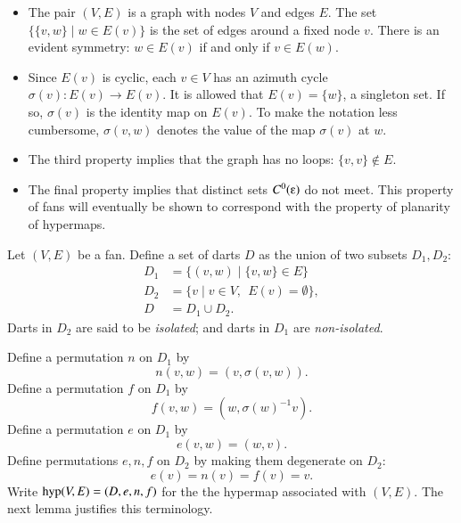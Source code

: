 \begin{remark}
\begin{itemize}
\item The pair $(V,E)$ is a graph with nodes $V$ and edges $E$.  The set
$\{\{v,w\}\mid w\in E(v)\}$ is the set of edges around a fixed node $v$.
There is an evident symmetry:  $w\in E(v)$ if and only if $v\in E(w)$.   
%
\item
Since $E(v)$ is cyclic,
each $v\in V$ has an azimuth cycle $\sigma(v):E(v)\to E(v)$.
It is allowed that $E(v) = \{w\}$,  a
singleton set. If so,
$\sigma(v)$ is the identity map on $E(v)$.
%
To make the notation less cumbersome, $\sigma(v,w)$ denotes the value of the map $\sigma(v)$ at $w$.
%
\item 
The third property implies that the graph has no loops: $\{v,v\}\not\in E$.
%
\item The final property implies that distinct sets $C^0(\e)$
do not meet.   This property of fans will eventually be shown to correspond with the property of planarity of hypermaps.
%
\end{itemize}
\end{remark}


Let $(V,E)$ be a fan.  Define a set of darts $D$ as the union of
two subsets $D_1,D_2$:
    $$
    \begin{array}{lll}
    D_1 &= \{(v,w)\mid \{v,w\}\in E\}\\
    D_2 &= \{v \mid v\in V,\ \ E(v) = \emptyset\},\\
    D   &= D_1\cup D_2.
    \end{array}
    $$
Darts in $D_2$ are said to be {\it isolated}; and darts in $D_1$ are {\it non-isolated}.
%

Define a permutation $n$ on $D_1$ by
    $$n(v,w) = (v,\sigma(v,w)).$$
Define a permutation $f$ on $D_1$ by
    $$
    f (v,w) = (w,\sigma(w)^{-1} v).
    $$
Define a permutation $e$ on $D_1$ by
    $$
    e (v,w) = (w,v).
    $$
Define permutations $e,n,f$ on $D_2$ by making them degenerate on $D_2$:
    $$
    e (v) = n(v) = f(v) = v.
    $$
Write %
${\operatorname{hyp}}(V,E)=(D,e,n,f)$ for the %
the hypermap associated with $(V,E)$.  The next
lemma justifies this terminology.



